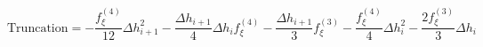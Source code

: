 \begin{equation} 
\text{Truncation} = - \frac{f^{{(4)}}_{{\xi}}}{12} \Delta h_{{i+1}}^{2} - \frac{\Delta h_{{i+1}}}{4} \Delta h_{{i}} f^{{(4)}}_{{\xi}} - \frac{\Delta h_{{i+1}}}{3} f^{{(3)}}_{{\xi}} - \frac{f^{{(4)}}_{{\xi}}}{4} \Delta h_{{i}}^{2} - \frac{2 f^{{(3)}}_{{\xi}}}{3} \Delta h_{{i}}
 \end{equation}